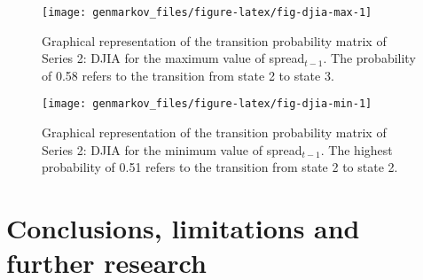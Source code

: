 \begin{figure}

{\centering \texttt{[image: genmarkov\_files/figure-latex/fig-djia-max-1]} 

}

\caption{Graphical representation of the transition probability matrix of Series 2: DJIA for the maximum value of spread$_{t-1}$. The probability of 0.58 refers to the transition from state 2 to state 3.}\label{fig:fig-djia-max}
\end{figure}

\begin{figure}

{\centering \texttt{[image: genmarkov\_files/figure-latex/fig-djia-min-1]} 

}

\caption{Graphical representation of the transition probability matrix of Series 2: DJIA for the minimum value of spread$_{t-1}$. The highest probability of 0.51 refers to the transition from state 2 to state 2.}\label{fig:fig-djia-min}
\end{figure}

\hypertarget{conclusions-limitations-and-further-research}{%
\section{Conclusions, limitations and further research}\label{conclusions-limitations-and-further-research}}

